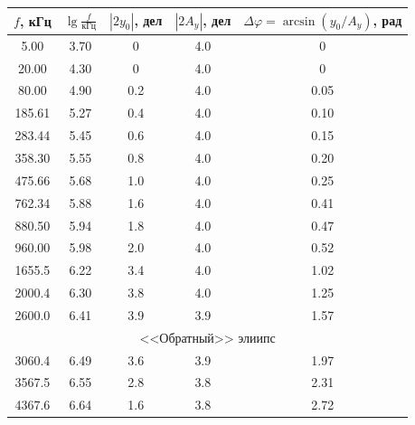 \documentclass[14pt]{article}
\begin{document}
\begin{center}
\begin{tabular}{|c|c|c|c|c|}
\hline
$f$, кГц	&	$\lg \frac{f}{\text{кГц}}$ &	$|2y_0|$, дел	&	$|2A_y|$, дел	&	$\Delta \varphi = \arcsin (y_0/A_y)$, рад\\
\hline
5.00		&	3.70						&	0				&	4.0				&	0							\\
\hline
20.00		&	4.30						&	0				&	4.0				&	0							\\
\hline
80.00		&	4.90						&	0.2				&	4.0				&	0.05						\\
\hline
185.61		&	5.27						&	0.4				&	4.0				&	0.10						\\
\hline
283.44		&	5.45						&	0.6				&	4.0				&	0.15						\\
\hline
358.30		&	5.55						&	0.8				&	4.0				&	0.20						\\
\hline
475.66		&	5.68						&	1.0				&	4.0				&	0.25						\\
\hline
762.34		&	5.88						&	1.6				&	4.0				&	0.41						\\
\hline
880.50		&	5.94						&	1.8				&	4.0				&	0.47						\\
\hline
960.00		&	5.98						&	2.0				&	4.0				&	0.52						\\
\hline
1655.5		&	6.22						&	3.4				&	4.0				&	1.02						\\
\hline
2000.4		&	6.30						&	3.8				&	4.0				&	1.25						\\
\hline
2600.0		&	6.41						&	3.9				&	3.9				&	1.57						\\
\hline
\multicolumn{5}{|c|}{$\text{<<Обратный>> элиипс}$}\\
\hline
3060.4		&	6.49						&	3.6				&	3.9				&	1.97						\\
\hline
3567.5		&	6.55						&	2.8				&	3.8				&	2.31						\\
\hline
4367.6		&	6.64						&	1.6				&	3.8				&	2.72						\\
\hline
\end{tabular}
\end{center}


\vspace{0.5cm}
\begin{center}
\end{center}
\end{document}
